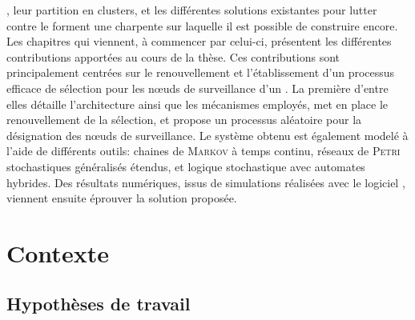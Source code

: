 \vfil
{}, leur partition en clusters, et les différentes solutions existantes pour lutter contre le \dds forment une charpente sur laquelle il est possible de construire encore.
Les chapitres qui viennent, à commencer par celui-ci, présentent les différentes contributions apportées au cours de la thèse.
Ces contributions sont principalement centrées sur le renouvellement et l'établissement d'un processus efficace de sélection pour les nœuds de surveillance d'un \rcs.
La première d'entre elles détaille l'architecture ainsi que les mécanismes employés, met en place le renouvellement de la sélection, et propose un processus aléatoire pour la désignation des nœuds de surveillance.
Le système obtenu est également modelé à l'aide de différents outils: chaines de \textsc{Markov} à temps continu, réseaux de \textsc{Petri} stochastiques généralisés étendus, et logique stochastique avec automates hybrides.
Des résultats numériques, issus de simulations réalisées avec le logiciel \nsii, viennent ensuite éprouver la solution proposée.
\vfil

\section{Contexte}

\subsection{Hypothèses de travail}
